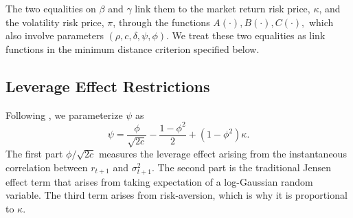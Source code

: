 \documentclass[11pt, letterpaper, twoside]{article}
\begin{document}
The two equalities on $\beta $ and $\gamma $ link them to the market return risk price, $\kappa$, and the volatility risk price, $\pi$,  through the functions $A(\cdot),B(\cdot ),C(\cdot ),$ which also involve parameters $(\rho ,c,\delta ,\psi ,\phi ).$ We treat these two equalities as link functions in the minimum distance criterion specified below.

\subsection{Leverage Effect Restrictions}\label{sec:leverage effect restrict}



Following \textcite{han2018leverage}, we parameterize $\psi$ as 
%
\begin{equation}
    \label{eqn:leverage restriction}
    \psi = \frac{\phi}{\sqrt{2c}} - \frac{1 - \phi^2}{2} + (1-\phi^2) \kappa.
\end{equation}
%
The first part $\phi / \sqrt{2 c}$ measures the leverage effect arising from the instantaneous correlation between $r_{t+1}$ and $\sigma^2_{t+1}$. 
The second part is the traditional Jensen effect term that arises from taking expectation of a log-Gaussian random variable.  The third term arises from risk-aversion, which is why it is proportional to $\kappa$.
%
\end{document}
